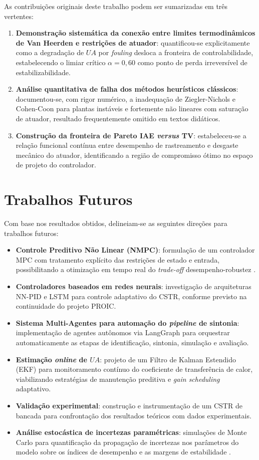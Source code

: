 As contribuições originais deste trabalho podem ser sumarizadas em três vertentes:
\begin{enumerate}
    \item \textbf{Demonstração sistemática da conexão entre limites termodinâmicos de Van Heerden e restrições de atuador}: quantificou-se explicitamente como a degradação de $UA$ por \textit{fouling} desloca a fronteira de controlabilidade, estabelecendo o limiar crítico $\alpha = 0{,}60$ como ponto de perda irreversível de estabilizabilidade.
    \item \textbf{Análise quantitativa de falha dos métodos heurísticos clássicos}: documentou-se, com rigor numérico, a inadequação de Ziegler-Nichols e Cohen-Coon para plantas instáveis e fortemente não lineares com saturação de atuador, resultado frequentemente omitido em textos didáticos.
    \item \textbf{Construção da fronteira de Pareto IAE \emph{versus} TV}: estabeleceu-se a relação funcional contínua entre desempenho de rastreamento e desgaste mecânico do atuador, identificando a região de compromisso ótimo no espaço de projeto do controlador.
\end{enumerate}

\section{Trabalhos Futuros}
\label{sec:trabalhos_futuros}

Com base nos resultados obtidos, delineiam-se as seguintes direções para trabalhos futuros:
\begin{itemize}
    \item \textbf{Controle Preditivo Não Linear (NMPC)}: formulação de um controlador MPC com tratamento explícito das restrições de estado e entrada, possibilitando a otimização em tempo real do \textit{trade-off} desempenho-robustez \cite{Rawlings2017}.
    \item \textbf{Controladores baseados em redes neurais}: investigação de arquiteturas NN-PID e LSTM para controle adaptativo do CSTR, conforme previsto na continuidade do projeto PROIC.
    \item \textbf{Sistema Multi-Agentes para automação do \textit{pipeline} de sintonia}: implementação de agentes autônomos via LangGraph para orquestrar automaticamente as etapas de identificação, sintonia, simulação e avaliação.
    \item \textbf{Estimação \textit{online} de $UA$}: projeto de um Filtro de Kalman Estendido (EKF) para monitoramento contínuo do coeficiente de transferência de calor, viabilizando estratégias de manutenção preditiva e \textit{gain scheduling} adaptativo.
    \item \textbf{Validação experimental}: construção e instrumentação de um CSTR de bancada para confrontação dos resultados teóricos com dados experimentais.
    \item \textbf{Análise estocástica de incertezas paramétricas}: simulações de Monte Carlo para quantificação da propagação de incertezas nos parâmetros do modelo sobre os índices de desempenho e as margens de estabilidade \cite{Khalil2002}.
\end{itemize}
